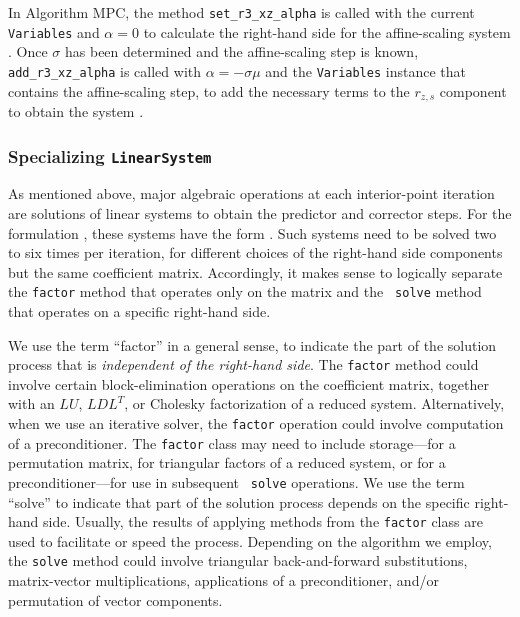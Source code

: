 In Algorithm MPC, the method
{\tt set\_r3\_xz\_alpha} is called with the current {\tt Variables}
and $\alpha=0$ to calculate the right-hand side for the affine-scaling
system . Once $\sigma$ has been determined and the
affine-scaling step is known, {\tt add\_r3\_xz\_alpha} is called with
$\alpha = -\sigma \mu$ and the {\tt Variables} instance that contains
the affine-scaling step, to add the necessary terms to the $r_{z,s}$
component to obtain the system . 

 
\subsubsection{Specializing {\tt LinearSystem}}
\label{sec:linsysclass}

As mentioned above, major algebraic operations at each interior-point
iteration are solutions of linear systems to obtain the predictor and
corrector steps. For the formulation , these systems have
the form .  Such systems need to be solved two to
six times per iteration, for different choices of the right-hand side
components but the same coefficient matrix.  Accordingly, it makes
sense to logically separate the \texttt{factor} method that
operates only on the matrix and the {\tt
  solve} method that operates on a specific right-hand side.

We use the term ``factor'' in a general sense, to indicate the part of
the solution process that is {\em independent of the right-hand side}.
The {\tt factor} method could involve certain block-elimination
operations on the coefficient matrix, together with an $LU$, $LDL^T$,
or Cholesky factorization of a reduced system. Alternatively, when we
use an iterative solver, the {\tt factor} operation could involve
computation of a preconditioner.  The {\tt factor} class may need to
include storage---for a permutation matrix, for triangular factors of
a reduced system, or for a preconditioner---for use in subsequent {\tt
solve} operations.  We use the term ``solve'' to indicate that part of
the solution process depends on the specific right-hand side. Usually,
the results of applying methods from the {\tt factor} class are used
to facilitate or speed the process. Depending on the algorithm we
employ, the {\tt solve} method could involve triangular
back-and-forward substitutions, matrix-vector multiplications,
applications of a preconditioner, and/or permutation of vector
components.

